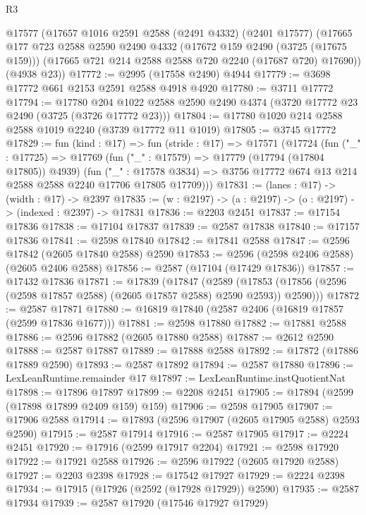 \begin{lexlean}{R3}
\begin{coremodule}
    @17577
    (@17657
      @1016
      @2591
      @2588
      (@2491 @4332)
      (@2401 @17577)
      (@17665
        @177
        @723
        @2588
        @2590
        @2490
        @4332
        (@17672 @159 @2490 (@3725 (@17675 @159)))
        (@17665 @721 @214 @2588 @2588 @720 @2240 (@17687 @720) @17690))
      (@4938 @23))
@17772 := @2995 (@17558 @2490) @4944
@17779 := @3698 @17772 @661 @2153 @2591 @2588 @4918 @4920
@17780 := @3711 @17772
@17794 := @17780
    @204
    @1022
    @2588
    @2590
    @2490
    @4374
    (@3720 @17772 @23 @2490 (@3725 (@3726 @17772 @23)))
@17804 := @17780 @1020 @214 @2588 @2588 @1019 @2240 (@3739 @17772 @11 @1019)
@17805 := @3745 @17772
@17829 := fun (kind : @17) =>
  fun (stride : @17) =>
  @17571
    (@17724
      (fun ("_" : @17725) =>
      @17769
        (fun ("_" : @17579) => @17779 (@17794 (@17804 @17805)) @4939)
        (fun ("_" : @17578 @3834) =>
        @3756 @17772 @674 @13 @214 @2588 @2588 @2240 @17706 @17805 @17709)))
@17831 := (lanes : @17) -> (width : @17) -> @2397
@17835 := (w : @2197) -> (a : @2197) -> (o : @2197) -> (indexed : @2397) -> @17831
@17836 := @2203 @2451
@17837 := @17154 @17836
@17838 := @17104 @17837
@17839 := @2587 @17838
@17840 := @17157 @17836
@17841 := @2598 @17840
@17842 := @17841 @2588
@17847 := @2596 @17842 (@2605 @17840 @2588) @2590
@17853 := @2596 (@2598 @2406 @2588) (@2605 @2406 @2588)
@17856 := @2587 (@17104 (@17429 @17836))
@17857 := @17432 @17836
@17871 := @17839
    (@17847
      (@2589 (@17853 (@17856 (@2596 (@2598 @17857 @2588) (@2605 @17857 @2588) @2590 @2593)) @2590)))
@17872 := @2587 @17871
@17880 := @16819 @17840 (@2587 @2406 (@16819 @17857 (@2599 @17836 @1677)))
@17881 := @2598 @17880
@17882 := @17881 @2588
@17886 := @2596 @17882 (@2605 @17880 @2588)
@17887 := @2612 @2590
@17888 := @2587 @17887
@17889 := @17888 @2588
@17892 := @17872 (@17886 @17889 @2590)
@17893 := @2587 @17892
@17894 := @2587 @17880
@17896 := LexLeanRuntime.remainder @17
@17897 := LexLeanRuntime.instQuotientNat
@17898 := @17896 @17897
@17899 := @2208 @2451
@17905 := @17894 (@2599 (@17898 @17899 @2409 @159) @159)
@17906 := @2598 @17905
@17907 := @17906 @2588
@17914 := @17893 (@2596 @17907 (@2605 @17905 @2588) @2593 @2590)
@17915 := @2587 @17914
@17916 := @2587 @17905
@17917 := @2224 @2451
@17920 := @17916 (@2599 @17917 @2204)
@17921 := @2598 @17920
@17922 := @17921 @2588
@17926 := @2596 @17922 (@2605 @17920 @2588)
@17927 := @2203 @2398
@17928 := @17542 @17927
@17929 := @2224 @2398
@17934 := @17915 (@17926 (@2592 (@17928 @17929)) @2590)
@17935 := @2587 @17934
@17939 := @2587 @17920 (@17546 @17927 @17929)

\end{coremodule}
\end{lexlean}
